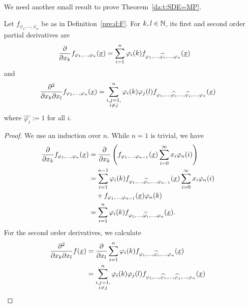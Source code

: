 \noindent
We need another small result to prove Theorem~\ref{da:t:SDE=MP}.

\begin{Lemma} \label{da:l:f'}
Let $f_{\varphi_1,\ldots,\varphi_n}$ be as in Definition~\ref{pre:d:F}. For $k,l \in \mathbb{N}$, its 
first and second order partial derivatives are 
\begin{align*}
\frac{\partial}{\partial x_k} f_{\varphi_1,\ldots,\varphi_n}(\underline{x}) 
&= 	\sum_{i=1}^n \varphi_i(k)
f_{\varphi_1,\ldots,\widehat{\varphi_i},\ldots,\varphi_n}(\underline{x})
\end{align*}
and
\begin{align*}
\frac{\partial^2}{\partial x_k \partial x_l} f_{\varphi_1,\ldots,\varphi_n} (\underline{x})
= \sum_{\substack{i,j=1,\\i \not = j}}^n \varphi_i(k) \varphi_j(l)
f_{\varphi_1,\ldots,\widehat{\varphi_i},\ldots,\widehat{\varphi_j},\ldots,\varphi_n}(\underline{x}) 
\end{align*}
where $\widehat{\varphi_i} := 1$ for all $i$.
\end{Lemma}

\begin{proof}
We use an induction over $n$. While
$n=1$ is trivial, we have
\begin{align*}
\frac{\partial}{\partial x_k} f_{\varphi_1,\ldots,\varphi_n}(\underline{x})
&=	\frac{\partial}{\partial x_k} \left( f_{\varphi_1,\ldots,\varphi_{n-1}}(\underline{x}) 
	\sum_{i=0}^\infty x_i \varphi_n(i) \right) \\
&=	\sum_{i=1}^{n-1} \varphi_i(k)
f_{\varphi_1,\ldots,\widehat{\varphi_i},\ldots,\varphi_{n-1}}(\underline{x})
	\sum_{i=0}^\infty x_i \varphi_n(i) \\
&\quad + f_{\varphi_1,\ldots,\varphi_{n-1}}(\underline{x}) \varphi_n(k)
	 \\
&= 	\sum_{i=1}^n \varphi_i(k) f_{\varphi_1,\ldots,\widehat{\varphi_i},\ldots,\varphi_n}(\underline{x}).
\end{align*}
For the second order derivatives, we calculate
\begin{align*}
\frac{\partial^2}{\partial x_k \partial x_l} f(\underline{x})
&=	\frac{\partial}{\partial x_l} \sum_{i=1}^n \varphi_i(k) 
	f_{\varphi_1,\ldots,\widehat{\varphi_i},\ldots,\varphi_n}(\underline{x}) \\
&= \sum_{\substack{i,j=1,\\i \not = j}}^n \varphi_i(k) \varphi_j(l)
f_{\varphi_1,\ldots,\widehat{\varphi_i},\ldots,\widehat{\varphi_j},\ldots,\varphi_n}(\underline{x}) 
\qedhere
\end{align*}
\end{proof}

